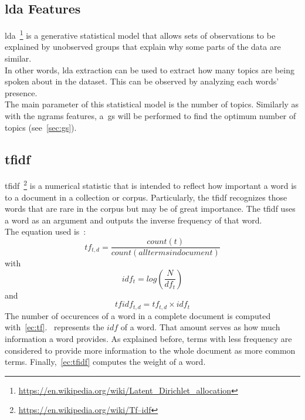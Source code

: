 \subsection{\acf{lda} Features}
\ac{lda}~\footnote{\url{https://en.wikipedia.org/wiki/Latent_Dirichlet_allocation}} is a generative statistical model that allows sets of observations to be explained by unobserved groups that explain why some parts of the data are similar.\\ In other words, \ac{lda} extraction can be used to extract how many topics are being spoken about in the dataset. This can be observed by analyzing each words' presence.\\
The main parameter of this statistical model is the number of topics. Similarly as with the ngrams features, a~\ac{gs} will be performed to find the optimum number of topics (see~\cref{sec:gs}).
\subsection{\acf{tfidf}}
\label{sec:tfidf}
\ac{tfidf}~\footnote{\url{https://en.wikipedia.org/wiki/Tf–idf}} is a numerical statistic that is intended to reflect how important a word is to a document in a collection or corpus. Particularly, the \ac{tfidf} recognizes those words that are rare in the corpus but may be of great importance. The \ac{tfidf} uses a word as an argument and outputs the inverse frequency of that word.\\
The equation used is~\cite{tfidf}:
\begin{equation}
\label{ec:tf}
	tf_{t,d} = \frac{count(t)}{count(alltermsindocument)}
\end{equation}
with
\begin{equation}
\label{ec:idf}
	idf_t=log(\frac{N}{df_t})
\end{equation}
and
\begin{equation}
\label{ec:tfidf}
	tfidf_{t,d}=tf_{t,d}\times idf_t
\end{equation}
The number of occurences of a word in a complete document is computed with~\cref{ec:tf}.~ represents the $idf$ of a word. That amount serves as how much information a word provides. As explained before, terms with less frequency are considered to provide more information to the whole document as more common terms. Finally,~\cref{ec:tfidf} computes the weight of a word.
